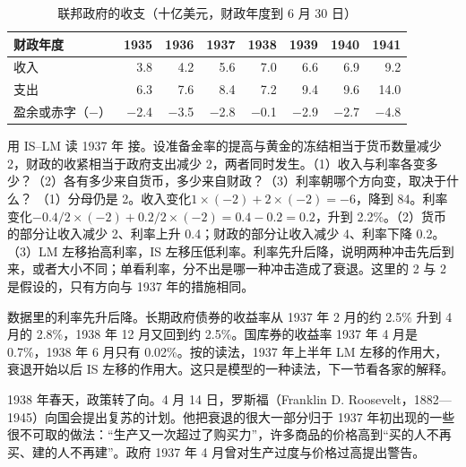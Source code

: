 \begin{table}[tbp]
\centering\small
\caption{联邦政府的收支（十亿美元，财政年度到 6 月 30 日）}\label{tab:islm-budget}
\begin{tabularx}{\linewidth}{@{}X r r r r r r r@{}}
\toprule
财政年度 & 1935 & 1936 & 1937 & 1938 & 1939 & 1940 & 1941 \\
\midrule
收入 & 3.8 & 4.2 & 5.6 & 7.0 & 6.6 & 6.9 & 9.2 \\
支出 & 6.3 & 7.6 & 8.4 & 7.2 & 9.4 & 9.6 & 14.0 \\
盈余或赤字（$-$） & $-$2.4 & $-$3.5 & $-$2.8 & $-$0.1 & $-$2.9 & $-$2.7 & $-$4.8 \\
\bottomrule
\end{tabularx}
\end{table}

\begin{example}{用 IS–LM 读 1937 年}\label{ex:islm-1937}
接。设准备金率的提高与黄金的冻结相当于货币数量减少 2，财政的收紧相当于政府支出减少 2，两者同时发生。（1）收入与利率各变多少？（2）各有多少来自货币，多少来自财政？（3）利率朝哪个方向变，取决于什么？
\solution
（1）分母仍是 2。收入变化$1\times(-2)+2\times(-2)=-6$，降到 84。利率变化$-0.4/2\times(-2)+0.2/2\times(-2)=0.4-0.2=0.2$，升到 2.2\%。（2）货币的部分让收入减少 2、利率上升 0.4；财政的部分让收入减少 4、利率下降 0.2。（3）LM 左移抬高利率，IS 左移压低利率。利率先升后降，说明两种冲击先后到来，或者大小不同；单看利率，分不出是哪一种冲击造成了衰退。这里的 2 与 2 是假设的，只有方向与 1937 年的措施相同。
\end{example}

数据里的利率先升后降。长期政府债券的收益率从 1937 年 2 月的约 2.5\% 升到 4 月的 2.8\%，1938 年 12 月又回到约 2.5\%\cite{bms1943b}。国库券的收益率 1937 年 4 月是 0.7\%，1938 年 6 月只有 0.02\%\cite{bms1943b}。按的读法，1937 年上半年 LM 左移的作用大，衰退开始以后 IS 左移的作用大。这只是模型的一种读法，下一节看各家的解释。

1938 年春天，政策转了向。4 月 14 日，罗斯福（Franklin D. Roosevelt，1882—1945）向国会提出复苏的计划\cite{app1938,bnf28}。他把衰退的很大一部分归于 1937 年初出现的一些很不可取的做法：“生产又一次超过了购买力”，许多商品的价格高到“买的人不再买、建的人不再建”\cite{app1938}。政府 1937 年 4 月曾对生产过度与价格过高提出警告\cite{app1938}。

